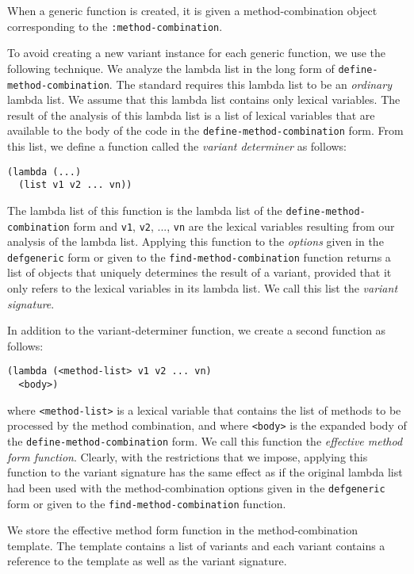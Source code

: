 When a generic function is created, it is
given a method-combination object corresponding to the
\texttt{:method-combination}.

To avoid creating a new variant instance for each generic function, we
use the following technique.  We analyze the lambda list in the long
form of \texttt{define-method-combination}.  The \commonlisp{}
standard requires this lambda list to be an \emph{ordinary} lambda
list.  We assume that this lambda list contains only lexical
variables.  The result of the analysis of this lambda list is a list
of lexical variables that are available to the body of the code in the
\texttt{define-method-combination} form.  From this list, we define a
function called the \emph{variant determiner} as follows:

\begin{verbatim}
(lambda (...)
  (list v1 v2 ... vn))
\end{verbatim}

The lambda list of this function is the lambda list of the
\texttt{define-method-combination} form and \texttt{v1}, \texttt{v2},
..., \texttt{vn} are the lexical variables resulting from our analysis
of the lambda list.  Applying this function to the \emph{options}
given in the \texttt{defgeneric} form or given to the
\texttt{find-method-combination} function returns a list of objects
that uniquely determines the result of a variant, provided that it
only refers to the lexical variables in its lambda list.  We call this
list the \emph{variant signature}.

In addition to the variant-determiner function, we create a second
function as follows:

\begin{verbatim}
(lambda (<method-list> v1 v2 ... vn)
  <body>)
\end{verbatim}

where \texttt{<method-list>} is a lexical variable that contains the
list of methods to be processed by the method combination, and where
\texttt{<body>} is the expanded body of the
\texttt{define-method-combination} form.  We call this function the
\emph{effective method form function}.  Clearly, with the
restrictions that we impose, applying this function to the variant
signature has the same effect as if the original lambda list had been
used with the method-combination options given in the
\texttt{defgeneric} form or given to the
\texttt{find-method-combination} function.

We store the effective method form function in the method-combination
template.  The template contains a list of variants and each variant
contains a reference to the template as well as the variant signature.

